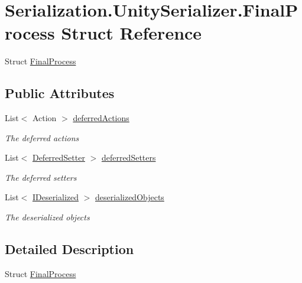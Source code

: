 \hypertarget{struct_serialization_1_1_unity_serializer_1_1_final_process}{}\section{Serialization.\+Unity\+Serializer.\+Final\+Process Struct Reference}
\label{struct_serialization_1_1_unity_serializer_1_1_final_process}


Struct \hyperlink{struct_serialization_1_1_unity_serializer_1_1_final_process}{Final\+Process}  


\subsection*{Public Attributes}
\begin{DoxyCompactItemize}
\item 
List$<$ Action $>$ \hyperlink{struct_serialization_1_1_unity_serializer_1_1_final_process_a203207ba91b57bf3588b7001ada7a4be}{deferred\+Actions}
\begin{DoxyCompactList}\small\item\em The deferred actions \end{DoxyCompactList}\item 
List$<$ \hyperlink{class_serialization_1_1_unity_serializer_1_1_deferred_setter}{Deferred\+Setter} $>$ \hyperlink{struct_serialization_1_1_unity_serializer_1_1_final_process_a4357b67e1c7e3cd82081012c44e28cec}{deferred\+Setters}
\begin{DoxyCompactList}\small\item\em The deferred setters \end{DoxyCompactList}\item 
List$<$ \hyperlink{interface_i_deserialized}{I\+Deserialized} $>$ \hyperlink{struct_serialization_1_1_unity_serializer_1_1_final_process_a9f54fa322554963f0f17a5ca1fe4b8fc}{deserialized\+Objects}
\begin{DoxyCompactList}\small\item\em The deserialized objects \end{DoxyCompactList}\end{DoxyCompactItemize}


\subsection{Detailed Description}
Struct \hyperlink{struct_serialization_1_1_unity_serializer_1_1_final_process}{Final\+Process} 



